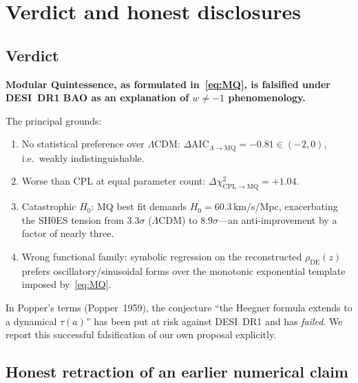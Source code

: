 \documentclass[11pt,letterpaper,twoside]{article}
\newcommand{\Lcdm}{\Lambda\mathrm{CDM}}
\newcommand{\rDE}{\rho_{\mathrm{DE}}}
\begin{document}
\section{Verdict and honest disclosures}\label{sec:verdict}

\subsection{Verdict}

\textbf{Modular Quintessence, as formulated in~\eqref{eq:MQ}, is falsified
under DESI~DR1 BAO as an explanation of $w\neq-1$ phenomenology.}

The principal grounds:
\begin{enumerate}[leftmargin=*,topsep=0.1em,itemsep=0.1em]
\item No statistical preference over $\Lcdm$:
      $\Delta\mathrm{AIC}_{\Lambda\to\mathrm{MQ}}=-0.81\in(-2,0)$, i.e.\ weakly
      indistinguishable.
\item Worse than CPL at equal parameter count:
      $\Delta\chi^{2}_{\mathrm{CPL}\to\mathrm{MQ}}=+1.04$.
\item Catastrophic $H_{0}$: MQ best fit demands $H_{0}=60.3$\,km/s/Mpc,
      exacerbating the SH0ES tension from $3.3\sigma$ ($\Lcdm$) to
      $8.9\sigma$---an anti-improvement by a factor of nearly three.
\item Wrong functional family: symbolic regression on the reconstructed
      $\rDE(z)$ prefers oscillatory/sinusoidal forms over the monotonic
      exponential template imposed by~\eqref{eq:MQ}.
\end{enumerate}
In Popper's terms (Popper~1959), the conjecture ``the Heegner formula extends
to a dynamical $\tau(a)$'' has been put at risk against DESI~DR1 and has
\emph{failed}. We report this successful falsification of our own proposal
explicitly.

\subsection{Honest retraction of an earlier numerical claim}
\end{document}
